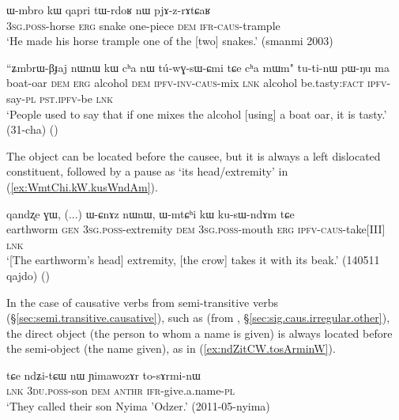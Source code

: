 \begin{exe}
\ex \label{ex:Wmbro.kW.pjAzrAtCaR}
\gll ɯ-mbro kɯ qapri tɯ-rdoʁ nɯ pjɤ-z-rɤtɕaʁ \\
\textsc{3sg}.\textsc{poss}-horse \textsc{erg} snake one-piece \textsc{dem} \textsc{ifr}-\textsc{caus}-trample \\
\glt `He made his horse trample one of the [two] snakes.' (smanmi 2003)
\end{exe}

\begin{exe}
\ex \label{ex:ZmbrWBJaj.kW.tuwGsWCmi}
\gll ``ʑmbrɯ-βɟaj nɯnɯ kɯ cʰa nɯ tú-wɣ-sɯ-ɕmi tɕe cʰa mɯm" tu-ti-nɯ pɯ-ŋu ma \\
boat-oar \textsc{dem} \textsc{erg} alcohol \textsc{dem} \textsc{ipfv}-\textsc{inv}-\textsc{caus}-mix \textsc{lnk} alcohol be.tasty:\textsc{fact} \textsc{ipfv}-say-\textsc{pl} \textsc{pst}.\textsc{ipfv}-be \textsc{lnk} \\
\glt `People used to say that if one mixes the alcohol [using] a boat oar, it is tasty.' (31-cha)
()
\end{exe}

The object can be located before the causee, but it is always a left dislocated constituent, followed by a pause as  `its head/extremity' in (\ref{ex:WmtChi.kW.kusWndAm}).

\begin{exe}
\ex \label{ex:WmtChi.kW.kusWndAm}
\gll  qandʐe ɣɯ, (...) ɯ-ɕnɤz nɯnɯ, ɯ-mtɕʰi kɯ ku-sɯ-ndɤm tɕe \\
earthworm \textsc{gen} {  } \textsc{3sg}.\textsc{poss}-extremity \textsc{dem} \textsc{3sg}.\textsc{poss}-mouth \textsc{erg} \textsc{ipfv}-\textsc{caus}-take[III] \textsc{lnk} \\
\glt `[The earthworm's head] extremity, [the crow] takes it with its beak.' (140511 qajdo)
()
\end{exe}

In the case of causative verbs from semi-transitive verbs (§\ref{sec:semi.transitive.causative}), such as  (from , §\ref{sec:sig.caus.irregular.other}),  the direct object (the person to whom a name is given) is always located before the semi-object (the name given), as in (\ref{ex:ndZitCW.tosArminW}).

\begin{exe}
\ex \label{ex:ndZitCW.tosArminW}
\gll tɕe ndʑi-tɕɯ nɯ ɲimawozɤr to-sɤrmi-nɯ \\
\textsc{lnk} \textsc{3du}.\textsc{poss}-son \textsc{dem}  \textsc{anthr} \textsc{ifr}-give.a.name-\textsc{pl} \\
\glt `They called their son Nyima 'Odzer.' (2011-05-nyima)
\end{exe}

